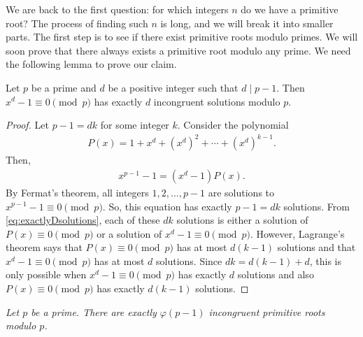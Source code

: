 \documentclass{subfile}
\begin{document}
We are back to the first question: for which integers $n$ do we have a primitive root? The process of finding such $n$ is long, and we will break it into smaller parts. The first step is to see if there exist primitive roots modulo primes. We will soon prove that there always exists a primitive root modulo any prime. We need the following lemma to prove our claim.

	\begin{lemma}\label{lem:exactlyDsolutions}
		Let $p$ be a prime and $d$ be a positive integer such that $d \mid p-1$. Then $x^d -1 \equiv 0 \pmod p$ has exactly $d$ incongruent solutions modulo $p$.
	\end{lemma}

	\begin{proof}
		Let $p-1=dk$ for some integer $k$. Consider the polynomial
			\begin{align*}
				P(x)= 1+x^d + \left(x^d\right)^2 + \cdots + \left(x^d\right)^{k-1}.
			\end{align*}
		Then,
			\begin{align}\label{eq:exactlyDsolutions}
				x^{p-1} -1 = (x^d-1)P(x).
			\end{align}
		By Fermat's theorem, all integers $1, 2, \ldots, p-1$ are solutions to $x^{p-1}-1 \equiv 0 \pmod p$. So, this equation has exactly $p-1=dk$ solutions. From \eqref{eq:exactlyDsolutions}, each of these $dk$ solutions is either a solution of $P(x) \equiv 0 \pmod p$ or a solution of $x^d-1 \equiv 0 \pmod p$. However, Lagrange's theorem says that $P(x) \equiv 0 \pmod p$ has at most $d(k-1)$ solutions and that $x^d-1 \equiv 0 \pmod p$ has at most $d$ solutions. Since $dk=d(k-1)+d$, this is only possible when $x^d-1 \equiv 0 \pmod p$ has exactly $d$ solutions and also $P(x) \equiv 0 \pmod p$ has exactly $d(k-1)$ solutions.
	\end{proof}

	\begin{theorem}\slshape\label{thm:primeprimitive}
		Let $p$ be a prime. There are exactly $\varphi(p-1)$ incongruent primitive roots modulo $p$.
	\end{theorem}
\end{document}
